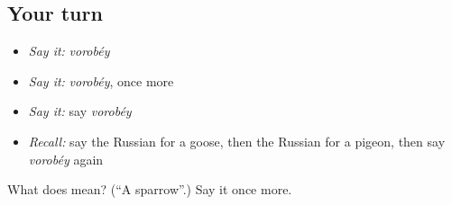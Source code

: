 \subsection*{Your turn}
\begin{itemize}
\raggedright
  \item \emph{Say it:} \emph{vorobéy}
  \item \emph{Say it:} \emph{vorobéy}, once more
  \item \emph{Say it:} say \emph{vorobéy}
  \item \emph{Recall:} say the Russian for a goose, then the Russian for a pigeon, then say \emph{vorobéy} again
\end{itemize}

\begin{tcolorbox}[breakable,colback=teal!4,colframe=teal!35!black,title={Before you move on}]
What does  mean? (\textquotedblleft{}A sparrow\textquotedblright{}.) Say it once more.
\end{tcolorbox}
